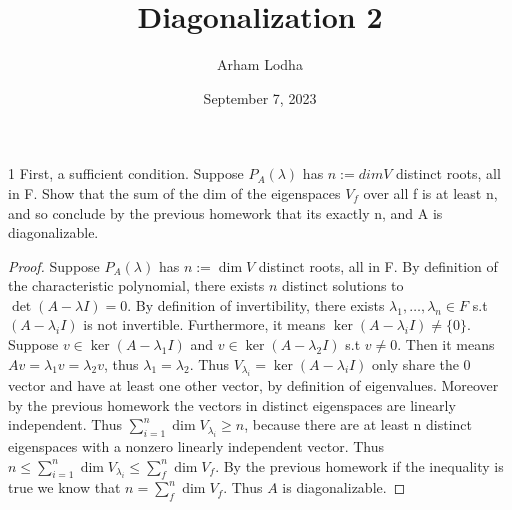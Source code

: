 \documentclass{article}
\begin{document}
\title{Diagonalization 2}
\author{Arham Lodha}%
\date{September 7, 2023}%
\maketitle

\begin{PROB}{1}\label{Problem 1.}
    First, a sufficient condition. Suppose $P_A(\lambda)$ has $n := dim V$ distinct roots, all in F. Show that the sum of the dim of the eigenspaces $V_f$ over all f is at least n, and so conclude by the previous homework that its exactly n, and A is diagonalizable.
\end{PROB}
\begin{proof}
    Suppose $P_A(\lambda)$ has $n := \dim V$ distinct roots, all in F. By definition of the characteristic polynomial, there exists $n$ distinct solutions to $\det(A - \lambda I) = 0$. By definition of invertibility, there exists $\lambda_1, \ldots, \lambda_n \in F$ s.t $(A - \lambda_i I)$ is not invertible. Furthermore, it means $\ker(A - \lambda_i I) \neq \{0\}$. Suppose $v \in \ker(A - \lambda_1 I)$ and $v \in \ker(A - \lambda_2 I)$ s.t $v \neq 0$. Then it means $Av = \lambda_1v = \lambda_2v$, thus $\lambda_1 = \lambda_2$. Thus $V_{\lambda_i} = \ker(A - \lambda_i I)$ only share the 0 vector and have at least one other vector, by definition of eigenvalues. Moreover by the previous homework the vectors in distinct eigenspaces are linearly independent. Thus $\sum_{i=1}^{n}\dim V_{\lambda_i} \geq n$, because there are at least n distinct eigenspaces with a nonzero linearly independent vector. Thus $n \leq \sum_{i=1}^{n}\dim V_{\lambda_i} \leq \sum_{f}^{n}\dim V_f$. By the previous homework if the inequality is true we know that $n = \sum_{f}^{n}\dim V_f$. Thus $A$ is diagonalizable.
\end{proof}

\bigskip
\end{document}
